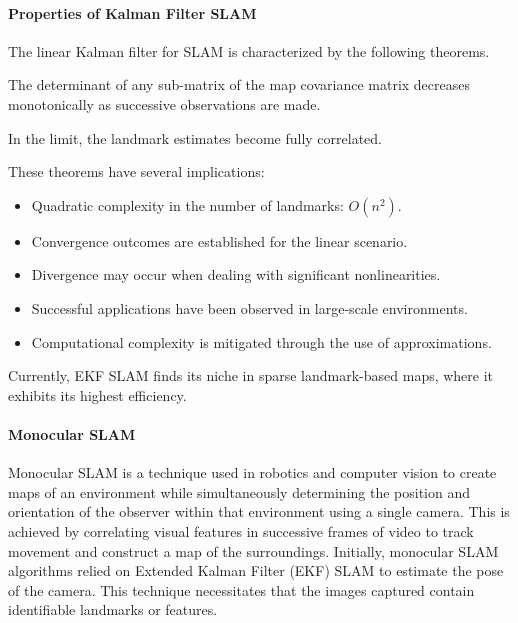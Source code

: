 \paragraph*{Properties of Kalman Filter SLAM}
The linear Kalman filter for SLAM is characterized by the following theorems.
\begin{theorem}
    The determinant of any sub-matrix of the map covariance matrix decreases monotonically as successive observations are made.
\end{theorem}
\begin{theorem}
    In the limit, the landmark estimates become fully correlated.
\end{theorem}
These theorems have several implications:
\begin{itemize}
    \item Quadratic complexity in the number of landmarks: $O(n^2)$.
    \item Convergence outcomes are established for the linear scenario.
    \item Divergence may occur when dealing with significant nonlinearities.
    \item Successful applications have been observed in large-scale environments.
    \item Computational complexity is mitigated through the use of approximations.
\end{itemize}
Currently, EKF SLAM finds its niche in sparse landmark-based maps, where it exhibits its highest efficiency.

\paragraph*{Monocular SLAM}
Monocular SLAM is a technique used in robotics and computer vision to create maps of an environment while simultaneously determining the position and orientation of the observer within that environment using a single camera.
This is achieved by correlating visual features in successive frames of video to track movement and construct a map of the surroundings.
Initially, monocular SLAM algorithms relied on Extended Kalman Filter (EKF) SLAM to estimate the pose of the camera. 
This technique necessitates that the images captured contain identifiable landmarks or features.


